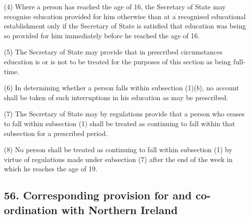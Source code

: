 \documentclass[12pt,a4paper]{article}
\begin{document}
(4) Where a person has reached the age of 16, the Secretary of State may recognise education provided for him otherwise than at a recognised educational establishment only if the Secretary of State is satisfied that education was being so provided for him immediately before he reached the age of 16.

(5) The Secretary of State may provide that in prescribed circumstances education is or is not to be treated for the purposes of this section as being full-time.

(6) In determining whether a person falls within subsection (1)($b$), no account shall be taken of such interruptions in his education as may be prescribed.

(7) The Secretary of State may by regulations provide that a person who ceases to fall within subsection (1)  shall be treated as continuing to fall within that subsection for a prescribed period.

(8) No person shall be treated as continuing to fall within subsection (1)  by virtue of regulations made under subsection (7)  after the end of the week in which he reaches the age of 19.


%
%
%
%


\subsection{56. Corresponding provision for and co-ordination with Northern Ireland}
\end{document}

